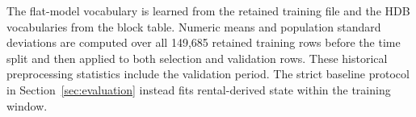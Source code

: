 The flat-model vocabulary is learned from the retained training file and the HDB vocabularies from the block table.  Numeric means and population standard deviations are computed over all 149,685 retained training rows before the time split and then applied to both selection and validation rows.  These historical preprocessing statistics include the validation period.  The strict baseline protocol in Section~\ref{sec:evaluation} instead fits rental-derived state within the training window.
